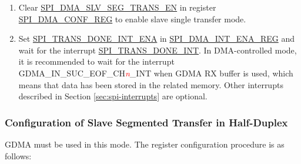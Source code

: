 \documentclass[main\_\_EN.tex]{subfiles}
\begin{document}
\begin{enumerate}
    \item Clear \hyperref[fielddesc:SPIDMASLVSEGTRANSEN]{SPI\_DMA\_SLV\_SEG\_TRANS\_EN} in register \hyperref[regdesc:SPIDMACONFREG]{SPI\_DMA\_CONF\_REG} to enable slave single transfer mode.

    \item Set \hyperref[fielddesc:SPITRANSDONEINTENA]{SPI\_TRANS\_DONE\_INT\_ENA} in \hyperref[regdesc:SPIDMAINTENAREG]{SPI\_DMA\_INT\_ENA\_REG} and wait for the interrupt \hyperref[int:SPITRANSDONEINT]{SPI\_TRANS\_DONE\_INT}. In DMA-controlled mode, it is recommended to wait for the interrupt GDMA\_IN\_SUC\_EOF\_CH\textcolor{red}{\it{n}}\_INT when GDMA RX buffer is used, which means that data has been stored in the related memory. Other interrupts described in Section \ref{sec:spi-interrupts} are optional.
\end{enumerate}


\subsubsection{Configuration of Slave Segmented Transfer in Half-Duplex}\label{sec:spi-config-slave-seg-trans-half-duplex}

GDMA must be used in this mode. The register configuration procedure is as follows:
\end{document}
